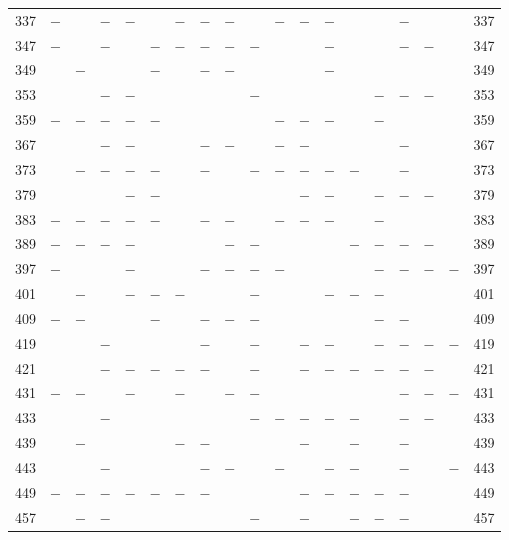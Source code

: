 \begin{center}
\begin{tabular}{r|c|c|c|c|c|c|c|c|c|c|c|c|c|c|c|c|c|r}
337 & $-$ &  & $-$ & $-$ &  & $-$ & $-$ & $-$ &  & $-$ & $-$ & $-$ &  &  & $-$ &  &  & 337\\
347 & $-$ &  & $-$ &  & $-$ & $-$ & $-$ & $-$ & $-$ &  &  & $-$ &  &  & $-$ & $-$ &  & 347\\
349 &  & $-$ &  &  & $-$ &  & $-$ & $-$ &  &  &  & $-$ &  &  &  &  &  & 349\\
353 &  &  & $-$ & $-$ &  &  &  &  & $-$ &  &  &  &  & $-$ & $-$ & $-$ &  & 353\\
359 & $-$ & $-$ & $-$ & $-$ & $-$ &  &  &  &  & $-$ & $-$ & $-$ &  & $-$ &  &  &  & 359\\
367 &  &  & $-$ & $-$ &  &  & $-$ & $-$ &  & $-$ & $-$ &  &  &  & $-$ &  &  & 367\\
373 &  & $-$ & $-$ & $-$ & $-$ &  & $-$ &  & $-$ & $-$ & $-$ & $-$ & $-$ &  & $-$ &  &  & 373\\
379 &  &  &  & $-$ & $-$ &  &  &  &  &  & $-$ & $-$ &  & $-$ & $-$ & $-$ &  & 379\\
383 & $-$ & $-$ & $-$ & $-$ & $-$ &  & $-$ & $-$ &  & $-$ & $-$ & $-$ &  & $-$ &  &  &  & 383\\
389 & $-$ & $-$ & $-$ & $-$ &  &  &  & $-$ & $-$ &  &  &  & $-$ & $-$ & $-$ & $-$ &  & 389\\
397 & $-$ &  &  & $-$ &  &  & $-$ & $-$ & $-$ & $-$ &  &  &  & $-$ & $-$ & $-$ & $-$ & 397\\
401 &  & $-$ &  & $-$ & $-$ & $-$ &  &  & $-$ &  &  & $-$ & $-$ & $-$ &  &  &  & 401\\
409 & $-$ & $-$ &  &  & $-$ &  & $-$ & $-$ & $-$ &  &  &  &  & $-$ & $-$ &  &  & 409\\
419 &  &  & $-$ &  &  &  & $-$ &  & $-$ &  & $-$ & $-$ &  & $-$ & $-$ & $-$ & $-$ & 419\\
421 &  &  & $-$ & $-$ & $-$ & $-$ & $-$ &  & $-$ &  & $-$ & $-$ & $-$ & $-$ & $-$ & $-$ &  & 421\\
431 & $-$ & $-$ &  & $-$ &  & $-$ &  & $-$ & $-$ &  &  &  &  &  & $-$ & $-$ & $-$ & 431\\
433 &  &  & $-$ &  &  &  &  &  & $-$ & $-$ & $-$ & $-$ & $-$ &  & $-$ & $-$ &  & 433\\
439 &  & $-$ &  &  &  & $-$ & $-$ &  &  &  & $-$ &  & $-$ &  & $-$ &  &  & 439\\
443 &  &  & $-$ &  &  &  & $-$ & $-$ &  & $-$ &  & $-$ & $-$ &  & $-$ &  & $-$ & 443\\
449 & $-$ & $-$ & $-$ & $-$ & $-$ & $-$ & $-$ &  &  &  & $-$ & $-$ & $-$ & $-$ & $-$ &  &  & 449\\
457 &  & $-$ & $-$ &  &  &  &  &  & $-$ &  & $-$ &  & $-$ & $-$ & $-$ &  &  & 457\\

\end{tabular}
\end{center}
